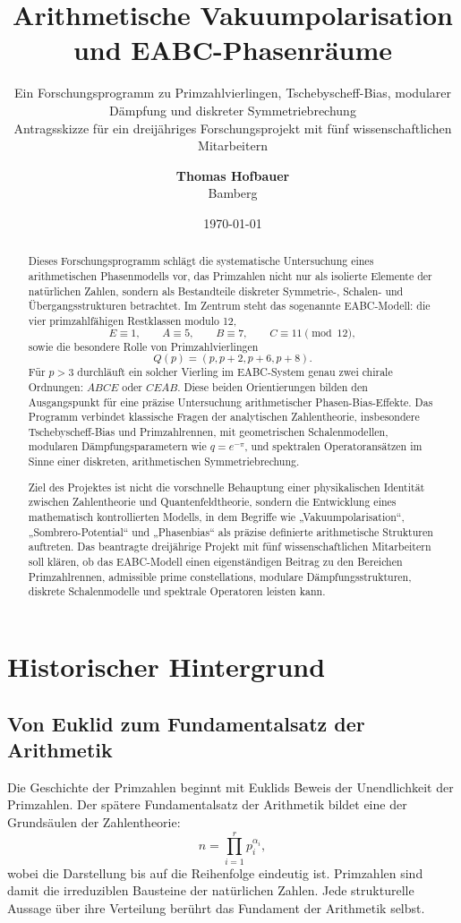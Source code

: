 \documentclass[11pt,a4paper,bibliography=totoc]{scrartcl}
\title{\textsf{Arithmetische Vakuumpolarisation und EABC-Phasenräume}}
\subtitle{Ein Forschungsprogramm zu Primzahlvierlingen, Tschebyscheff-Bias, modularer Dämpfung und diskreter Symmetriebrechung \\ \vspace{0.5em} \large Antragsskizze für ein dreijähriges Forschungsprojekt mit fünf wissenschaftlichen Mitarbeitern}
\author{\textbf{Thomas Hofbauer} \\ Bamberg}
\date{\today}
\begin{document}
	
	\maketitle
	
	\begin{abstract}
		\noindent Dieses Forschungsprogramm schlägt die systematische Untersuchung eines arithmetischen Phasenmodells vor, das Primzahlen nicht nur als isolierte Elemente der natürlichen Zahlen, sondern als Bestandteile diskreter Symmetrie-, Schalen- und Übergangsstrukturen betrachtet. Im Zentrum steht das sogenannte EABC-Modell: die vier primzahlfähigen Restklassen modulo 12,
		\[
		E \equiv 1, \qquad A \equiv 5, \qquad B \equiv 7, \qquad C \equiv 11 \pmod{12},
		\]
		sowie die besondere Rolle von Primzahlvierlingen
		\[
		Q(p) = (p, p+2, p+6, p+8).
		\]
		Für $p > 3$ durchläuft ein solcher Vierling im EABC-System genau zwei chirale Ordnungen: $ABCE$ oder $CEAB$. Diese beiden Orientierungen bilden den Ausgangspunkt für eine präzise Untersuchung arithmetischer Phasen-Bias-Effekte. Das Programm verbindet klassische Fragen der analytischen Zahlentheorie, insbesondere Tschebyscheff-Bias und Primzahlrennen, mit geometrischen Schalenmodellen, modularen Dämpfungsparametern wie $q = e^{-\pi}$, und spektralen Operatoransätzen im Sinne einer diskreten, arithmetischen Symmetriebrechung.
		
		Ziel des Projektes ist nicht die vorschnelle Behauptung einer physikalischen Identität zwischen Zahlentheorie und Quantenfeldtheorie, sondern die Entwicklung eines mathematisch kontrollierten Modells, in dem Begriffe wie „Vakuumpolarisation“, „Sombrero-Potential“ und „Phasenbias“ als präzise definierte arithmetische Strukturen auftreten. Das beantragte dreijährige Projekt mit fünf wissenschaftlichen Mitarbeitern soll klären, ob das EABC-Modell einen eigenständigen Beitrag zu den Bereichen Primzahlrennen, admissible prime constellations, modulare Dämpfungsstrukturen, diskrete Schalenmodelle und spektrale Operatoren leisten kann.
	\end{abstract}
	
	\tableofcontents
	\vfill
	\newpage
	
	\section{Historischer Hintergrund}
	
	\subsection{Von Euklid zum Fundamentalsatz der Arithmetik}
	Die Geschichte der Primzahlen beginnt mit Euklids Beweis der Unendlichkeit der Primzahlen. Der spätere Fundamentalsatz der Arithmetik bildet eine der Grundsäulen der Zahlentheorie:
	\[
	n = \prod_{i=1}^{r} p_i^{\alpha_i},
	\]
	wobei die Darstellung bis auf die Reihenfolge eindeutig ist. Primzahlen sind damit die irreduziblen Bausteine der natürlichen Zahlen. Jede strukturelle Aussage über ihre Verteilung berührt das Fundament der Arithmetik selbst.
	
\end{document}
